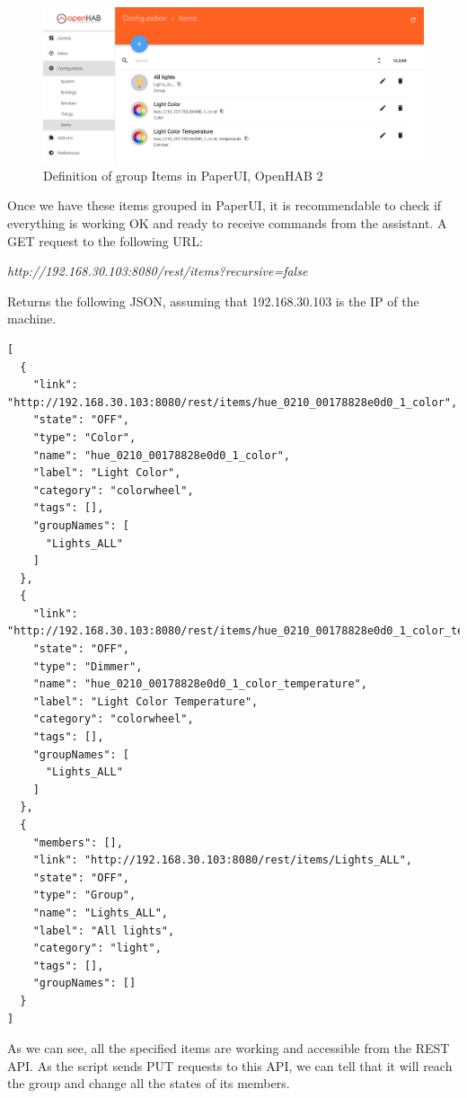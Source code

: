 \begin{figure}
	\centering
	\includegraphics[width=1\textwidth]{images/Chapter_06/group-definition-paperui.png}
	\caption{Definition of group Items in PaperUI, OpenHAB 2}
	\label{fig:group-definition-paperui}
\end{figure}

Once we have these items grouped in PaperUI, it is recommendable to check if everything is working OK and ready to receive commands
from the assistant. A GET request to the following URL:\\
\begin{center}
	\textit{http://192.168.30.103:8080/rest/items?recursive=false}\\
\end{center}
Returns the following JSON, assuming that 192.168.30.103 is the IP of the machine.

\begin{lstlisting}[style=Consola]
[
  {
    "link": "http://192.168.30.103:8080/rest/items/hue_0210_00178828e0d0_1_color",
    "state": "OFF",
    "type": "Color",
    "name": "hue_0210_00178828e0d0_1_color",
    "label": "Light Color",
    "category": "colorwheel",
    "tags": [],
    "groupNames": [
      "Lights_ALL"
    ]
  },
  {
    "link": "http://192.168.30.103:8080/rest/items/hue_0210_00178828e0d0_1_color_temperature",
    "state": "OFF",
    "type": "Dimmer",
    "name": "hue_0210_00178828e0d0_1_color_temperature",
    "label": "Light Color Temperature",
    "category": "colorwheel",
    "tags": [],
    "groupNames": [
      "Lights_ALL"
    ]
  },
  {
    "members": [],
    "link": "http://192.168.30.103:8080/rest/items/Lights_ALL",
    "state": "OFF",
    "type": "Group",
    "name": "Lights_ALL",
    "label": "All lights",
    "category": "light",
    "tags": [],
    "groupNames": []
  }
]
\end{lstlisting}

As we can see, all the specified items are working and accessible from the REST API. As the script sends PUT requests to this API,
we can tell that it will reach the group and change all the states of its members.


